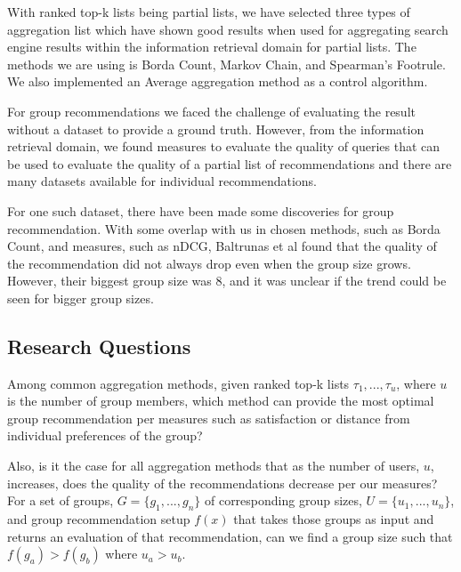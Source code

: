 With ranked top-k lists being partial lists, we have selected three types of aggregation list which have shown good results when used for aggregating search engine results within the information retrieval domain for partial lists. The methods we are using is Borda Count, Markov Chain, and Spearman's Footrule\cite{Masthoff2004, rank:aggregation}. We also implemented an Average aggregation method as a control algorithm\cite{Masthoff2004}.

For group recommendations we faced the challenge of evaluating the result without a dataset to provide a ground truth. However, from the information retrieval domain, we found measures to evaluate the quality of queries that can be used to evaluate the quality of a partial list of recommendations and there are many datasets available for individual recommendations.

For one such dataset, there have been made some discoveries for group recommendation. With some overlap with us in chosen methods, such as Borda Count, and measures, such as nDCG, Baltrunas et al found that the quality of the recommendation did not always drop even when the group size grows. However, their biggest group size was 8, and it was unclear if the trend could be seen for bigger group sizes.


\subsection{Research Questions}
Among common aggregation methods, given ranked top-k lists $\tau_1, ... , \tau_u$, where $u$ is the number of group members, which method can provide the most optimal group recommendation per measures such as satisfaction or distance from individual preferences of the group?

Also, is it the case for all aggregation methods that as the number of users, $u$, increases, does the quality of the recommendations decrease per our measures? For a set of groups, $G = \{ g_1, ..., g_n \}$ of corresponding group sizes, $U = \{ u_1, ..., u_n \}$, and group recommendation setup $f(x)$ that takes those groups as input and returns an evaluation of that recommendation, can we find a group size such that $f(g_a) > f(g_b)$ where $u_a > u_b$.


